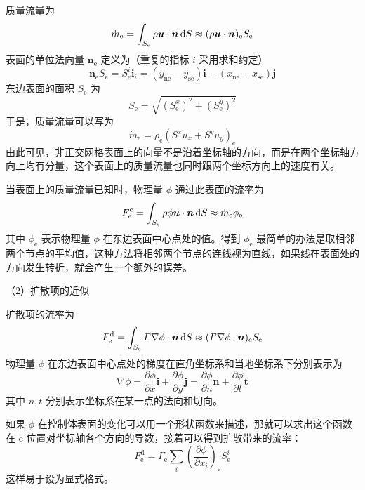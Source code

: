 质量流量为
\begin{equation}
	\dot m_{\mathrm{e}} = \int_{S_{\mathrm{e}}}\rho\bm{u}\cdot\bm{n}\,\mathrm{d} S \approx 
	(\rho\bm{u}\cdot\bm{n})_{\mathrm{e}} S_{\mathrm{e}}
\end{equation}
表面的单位法向量 $\bm{n}_{\mathrm{e}}$ 定义为（重复的指标 $i$ 采用求和约定）
\begin{equation}
	\bm{n}_{\mathrm{e}}S_{\mathrm{e}} = S_{\mathrm{e}}^i \bm{i}_i = 
	(y_{\mathrm{ne}}-y_{\mathrm{se}})\bm{i} - (x_{\mathrm{ne}}-x_{\mathrm{se}})\bm{j}
\end{equation}
东边表面的面积 $S_{\mathrm{e}}$ 为
\begin{equation}
	S_{\mathrm{e}} = \sqrt{(S_{\mathrm{e}}^x)^2 + (S_{\mathrm{e}}^y)^2}
\end{equation}
于是，质量流量可以写为
\begin{equation}
	\dot m_{\mathrm{e}} = \rho_{\mathrm{e}}(S^x u_x + S^y u_y)_{\mathrm{e}}
\end{equation}
由此可见，非正交网格表面上的向量不是沿着坐标轴的方向，而是在两个坐标轴方向上均有分量，这个表面上的质量流量也同时跟两个坐标方向上的速度有关。

当表面上的质量流量已知时，物理量 $\phi$ 通过此表面的流率为
\begin{equation}
	F_{\mathrm{e}}^{\mathrm{c}} = \int_{S_{\mathrm{e}}}\rho\phi\bm{u}\cdot\bm{n}\,\mathrm{d} S \approx \dot m_{\mathrm{e}} \phi_{\mathrm{e}}
\end{equation}
其中 $\phi_{\mathrm{e}}$ 表示物理量 $\phi$ 在东边表面中心点处的值。得到 $\phi_{\mathrm{e}}$ 最简单的办法是取相邻两个节点的平均值，这种方法将相邻两个节点的连线视为直线，如果线在表面处的方向发生转折，就会产生一个额外的误差。

（2）扩散项的近似

扩散项的流率为
\begin{equation}
	F_{\mathrm{e}}^{\mathrm{d}} = 
	\int_{S_{\mathrm{e}}}\varGamma\nabla\phi\cdot\bm{n}\,\mathrm{d} S \approx
	(\varGamma\nabla\phi\cdot\bm{n})_{\mathrm{e}} S_{\mathrm{e}}
\end{equation}
物理量 $\phi$ 在东边表面中心点处的梯度在直角坐标系和当地坐标系下分别表示为
\begin{equation}
	\nabla\phi = 
	\frac{\partial\phi}{\partial x}\bm{i} + \frac{\partial\phi}{\partial y}\bm{j} = 
	\frac{\partial\phi}{\partial n}\bm{n} + \frac{\partial\phi}{\partial t}\bm{t}
\end{equation}
其中 $n,t$ 分别表示坐标系在某一点的法向和切向。

如果 $\phi$ 在控制体表面的变化可以用一个形状函数来描述，那就可以求出这个函数在 e 位置对坐标轴各个方向的导数，接着可以得到扩散带来的流率：
\begin{equation}\label{eq: diffusive flux}
	F_{\mathrm{e}}^{\mathrm{d}} = \varGamma_{\mathrm{e}} \sum_i \left(\frac{\partial\phi}{\partial x_i}\right)_{\mathrm{e}} S_{\mathrm{e}}^i
\end{equation}
这样易于设为显式格式。

